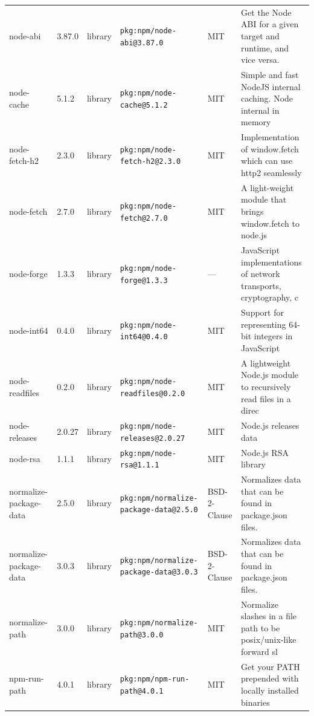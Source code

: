 \documentclass[11pt,a4paper]{article}
\begin{document}
\begin{longtable}{|p{4cm}|p{2cm}|p{1.6cm}|p{5cm}|p{1.5cm}|p{3.5cm}|}
\raggedright node-abi & 3.87.0 & library & \small\texttt{pkg:npm/node-abi@3.87.0} & MIT & \small Get the Node ABI for a given target and runtime, and vice versa. \\
\raggedright node-cache & 5.1.2 & library & \small\texttt{pkg:npm/node-cache@5.1.2} & MIT & \small Simple and fast NodeJS internal caching. Node internal in memory  \\
\raggedright node-fetch-h2 & 2.3.0 & library & \small\texttt{pkg:npm/node-fetch-h2@2.3.0} & MIT & \small Implementation of window.fetch which can use http2 seamlessly \\
\raggedright node-fetch & 2.7.0 & library & \small\texttt{pkg:npm/node-fetch@2.7.0} & MIT & \small A light-weight module that brings window.fetch to node.js \\
\raggedright node-forge & 1.3.3 & library & \small\texttt{pkg:npm/node-forge@1.3.3} & — & \small JavaScript implementations of network transports, cryptography, c \\
\raggedright node-int64 & 0.4.0 & library & \small\texttt{pkg:npm/node-int64@0.4.0} & MIT & \small Support for representing 64-bit integers in JavaScript \\
\raggedright node-readfiles & 0.2.0 & library & \small\texttt{pkg:npm/node-readfiles@0.2.0} & MIT & \small A lightweight Node.js module to recursively read files in a direc \\
\raggedright node-releases & 2.0.27 & library & \small\texttt{pkg:npm/node-releases@2.0.27} & MIT & \small Node.js releases data \\
\raggedright node-rsa & 1.1.1 & library & \small\texttt{pkg:npm/node-rsa@1.1.1} & MIT & \small Node.js RSA library \\
\raggedright normalize-package-data & 2.5.0 & library & \small\texttt{pkg:npm/normalize-package-data@2.5.0} & BSD-2-Clause & \small Normalizes data that can be found in package.json files. \\
\raggedright normalize-package-data & 3.0.3 & library & \small\texttt{pkg:npm/normalize-package-data@3.0.3} & BSD-2-Clause & \small Normalizes data that can be found in package.json files. \\
\raggedright normalize-path & 3.0.0 & library & \small\texttt{pkg:npm/normalize-path@3.0.0} & MIT & \small Normalize slashes in a file path to be posix/unix-like forward sl \\
\raggedright npm-run-path & 4.0.1 & library & \small\texttt{pkg:npm/npm-run-path@4.0.1} & MIT & \small Get your PATH prepended with locally installed binaries \\

\end{longtable}
\end{document}
